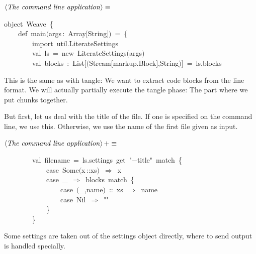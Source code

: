 \documentclass[a4paper,12pt]{article}
\begin{document}
$\left<\mbox{\emph{The command line application}}\right>\equiv$
\begin{program}{\vem object}~Weave~{\small\{}
\\~~~~{\vem def}~main$($args\,{\rm :}~Array$[$String$]$$)$~=~{\small\{}
\\~~~~~~~~{\vem import}~util.LiterateSettings
\\[0.5em]~~~~~~~~{\vem val}~ls~=~{\vem new}~LiterateSettings$($args$)$
\\[0.5em]~~~~~~~~{\vem val}~blocks~{\rm :}~List$[$$($Stream$[$markup.Block$]$,String$)$$]$~=~ls.blocks
\\[0.5em]\end{program}



This is the same as with tangle: We want to extract
code blocks from the line format. We will actually
partially execute the tangle phase: The part where we
put chunks together.

But first, let us deal with the title of the file. If one is specified
on the command line, we use this. Otherwise, we use the name of the first
file given as input.

$\left<\mbox{\emph{The command line application}}\right>+\equiv$
\begin{program}~~~~~~~~{\vem val}~filename~=~ls.settings~get~"$-$title"~{\vem match}~{\small\{}
\\~~~~~~~~~~~~{\vem case}~Some$($x\,{\rm :}{\rm :}xs$)$~$\Rightarrow$~x
\\~~~~~~~~~~~~{\vem case}~\_~$\Rightarrow$~blocks~{\vem match}~{\small\{}
\\~~~~~~~~~~~~~~~~{\vem case}~$($\_,name$)$~{\rm :}{\rm :}~xs~$\Rightarrow$~name
\\~~~~~~~~~~~~~~~~{\vem case}~Nil~$\Rightarrow$~""
\\~~~~~~~~~~~~{\small\}}
\\~~~~~~~~{\small\}}
\\[0.5em]\end{program}


Some settings are taken out of the settings object directly,
where to send output is handled specially.
\end{document}
